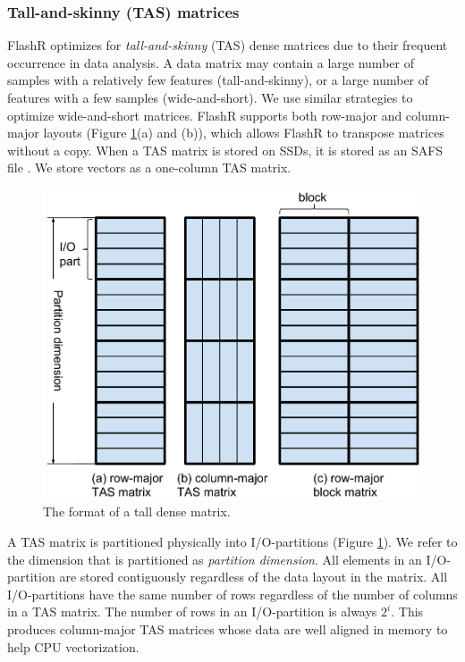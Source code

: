 \subsubsection{Tall-and-skinny (TAS) matrices}
FlashR optimizes for \textit{tall-and-skinny} (TAS) dense matrices
due to their frequent occurrence in data analysis. A data matrix may contain
a large number of samples with a relatively few features (tall-and-skinny),
or a large number of features with a few samples (wide-and-short).
We use similar strategies to optimize wide-and-short matrices. FlashR
supports both row-major and column-major layouts (Figure \ref{fig:den_mat}(a)
and (b)), which allows FlashR to transpose matrices without a copy.
When a TAS matrix is stored on SSDs, it is stored as an SAFS file
\cite{safs}. We store vectors as a one-column TAS matrix.

\begin{figure}
	\centering
	\includegraphics[scale=0.4]{FlashMatrix_figs/dense_matrix2.pdf}
	\caption{The format of a tall dense matrix.}
	\label{fig:den_mat}
  \vspace{-12pt}
\end{figure}

A TAS matrix is partitioned physically into I/O-partitions (Figure
\ref{fig:den_mat}). We refer to the dimension that is partitioned as
\textit{partition dimension}. All elements in an I/O-partition are stored
contiguously regardless of the data layout in the matrix. All 
I/O-partitions have the same number of rows regardless of
the number of columns in a TAS matrix. The number of rows in
an I/O-partition is always $2^i$. This produces column-major TAS
matrices whose data are well aligned in memory to help CPU vectorization.

